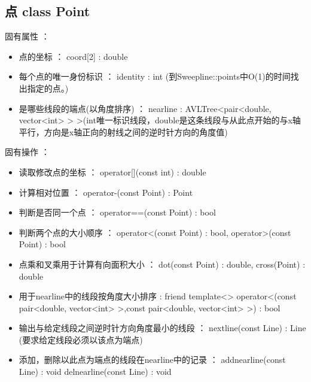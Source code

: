 \documentclass[a4paper]{book}
\numberwithin{equation}{chapter}
\theoremstyle{definition}
\begin{document}
\subsection{点 class Point}
固有属性 ：
\begin{itemize}
	\item  点的坐标 ： coord[2] : double
	\item  每个点的唯一身份标识 ： identity : int  (到Sweepline::points中O(1)的时间找出指定的点。)
	\item  是哪些线段的端点(以角度排序) ： nearline : AVLTree<pair<double,  vector<int> > >(int唯一标识线段，double是这条线段与从此点开始的与x轴平行，方向是x轴正向的射线之间的逆时针方向的角度值) 
\end{itemize}
固有操作 ：
\begin{itemize}
	\item  读取修改点的坐标 ： operator[](const int) : double
	\item  计算相对位置 ： operator-(const Point) : Point
	\item  判断是否同一个点 ： operator==(const Point) : bool
	\item  判断两个点的大小顺序  ： operator<(const Point) : bool, operator>(const Point) : bool 
	\item  点乘和叉乘用于计算有向面积大小  ： dot(const Point) : double, cross(Point) : double
	\item  用于nearline中的线段按角度大小排序  : friend template<> operator<(const pair<double, vector<int> >,const pair<double, vector<int> >) : bool
	\item  输出与给定线段之间逆时针方向角度最小的线段  ： nextline(const Line) : Line (要求给定线段必须以该点为端点)
	\item  添加，删除以此点为端点的线段在nearline中的记录 ： addnearline(const Line) : void delnearline(const Line) : void
\end{itemize}
\end{document}
